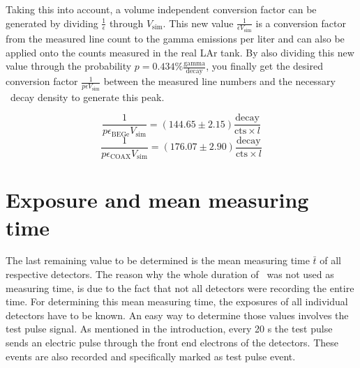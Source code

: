 \documentclass[encoding=utf8,british]{tumphthesis}
\begin{document}
Taking this into account, a volume independent conversion factor can be generated by dividing $\frac{1}{\epsilon}$ through $V_{\mathrm{sim}}$.
This new value $\frac{1}{\epsilon V_{\mathrm{sim}}}$ is a conversion factor from the measured line count to the gamma emissions per liter and can also be applied onto the counts measured in the real LAr tank.
By also dividing this new value through the probability $p=0.434\% \frac{\mathrm{gamma}} {\mathrm{decay}}$, you finally get the desired conversion factor $\frac{1}{ p\epsilon V_ {\mathrm{sim}}}$ between the measured line numbers and the necessary \Kr\ decay density to generate this peak. 
 
\begin{equation*}
\frac{1}{ p \epsilon_{\mathrm{BEGe}} V_{\mathrm{sim}}} = (144.65\pm2.15) \frac{\mathrm{decay}}{\mathrm{cts}\times \unit{l}}
\end{equation*}
\begin{equation*}
\frac{1}{p \epsilon_{\mathrm{COAX}} V_{\mathrm{sim}}} = (176.07\pm2.90) \frac{\mathrm{decay}}{\mathrm{cts} \times \unit{l}}
\end{equation*}



\section{Exposure and mean measuring time}
\label{sec:CalcActiv}

The last remaining value to be determined is the mean measuring time $\bar{t}$ of all respective detectors.
The reason why the whole duration of \PII\ was not used as measuring time, is due to the fact that not all detectors were recording the entire time.
For determining this mean measuring time, the exposures of all individual detectors have to be known.
An easy way to determine those values involves the test pulse signal.
As mentioned in the introduction, every 20 s the test pulse sends an electric pulse through the front end electrons of the detectors.
These events are also recorded and specifically marked as test pulse event. 
\\
\end{document}
